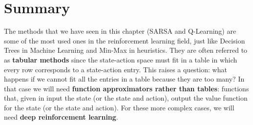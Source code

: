 \section{Summary}
The methods that we have seen in this chapter (SARSA and Q-Learning) are some of the most used ones in the reinforcement learning field, just like Decision Trees in Machine Learning and Min-Max in heuristics. They are often referred to as \textbf{tabular methods} since the state-action space must fit in a table in which every row corresponds to a state-action entry. This raises a question: what happens if we cannot fit all the entries in a table because they are too many? In that case we will need \textbf{function approximators rather than tables}: functions that, given in input the state (or the state and action), output the value function for the state (or the state and action). For these more complex cases, we will need \textbf{deep reinforcement learning}.